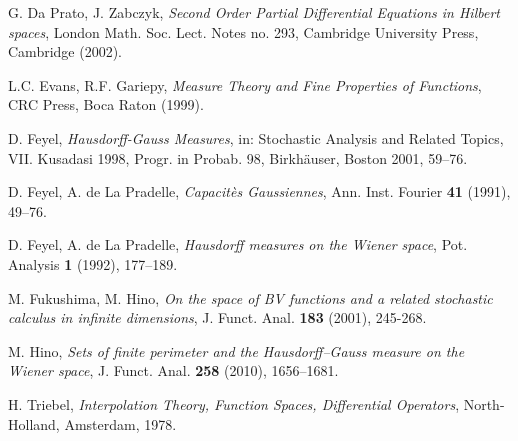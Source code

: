 \documentclass[reqno,twoside,12pt]{amsart}
\begin{document}
\begin{thebibliography}{99}
 G. Da Prato, J. Zabczyk, \textit{Second Order Partial Differential Equations in Hilbert spaces},
London  Math. Soc. Lect. Notes no. 293, Cambridge University Press, Cambridge (2002).

   L.C. Evans, R.F. Gariepy, \textit{Measure Theory and Fine Properties of Functions},  CRC Press, Boca Raton (1999). 

   D. Feyel,  \textit{Hausdorff-Gauss Measures}, in: Stochastic Analysis and Related Topics, VII. Kusadasi 1998, Progr. in Probab. 98, Birkh\"auser, Boston 2001, 59--76. 

   D. Feyel,  A. de La Pradelle, \textit{Capacit\`es Gaussiennes}, Ann. Inst. Fourier {\bf 41} (1991), 49--76. 
 
   D. Feyel,  A. de La Pradelle, \textit{ Hausdorff measures on the Wiener space}, Pot. Analysis {\bf 1} (1992), 177--189. 
 
  M. Fukushima, M. Hino, \textit{On the space of BV functions and a related stochastic calculus in infinite dimensions},
J. Funct. Anal. {\bf 183} (2001), 245-268.
 
 M. Hino, \textit{Sets of finite perimeter and the Hausdorff--Gauss measure on the Wiener space}, J. Funct. Anal. {\bf 258} (2010), 1656--1681.

H. Triebel,  \textit{Interpolation Theory, Function Spaces, 
Differential Operators}, North-Holland, Amsterdam, 1978.

\end{thebibliography}
\end{document}
